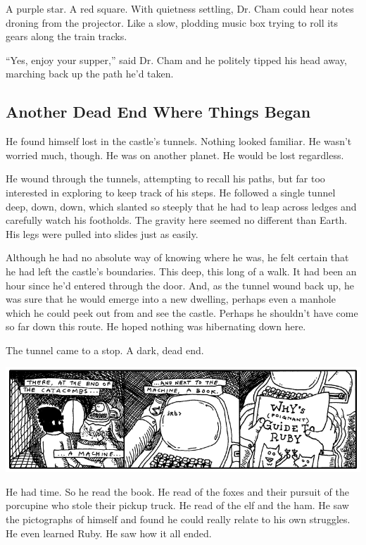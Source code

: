 \documentclass[10pt,twoside]{report}
\begin{document}
A purple star.  A red square.  With quietness settling, Dr. Cham could
hear notes droning from the projector.  Like a slow, plodding music
box trying to roll its gears along the train tracks.

``Yes, enjoy your supper,'' said Dr. Cham and he politely tipped his
head away, marching back up the path he'd taken.



\subsection{Another Dead End Where Things Began}



He found himself lost in the castle's tunnels.  Nothing looked
familiar.  He wasn't worried much, though.  He was on another planet.
He would be lost regardless.

He wound through the tunnels, attempting to recall his paths, but far
too interested in exploring to keep track of his steps.  He followed a
single tunnel deep, down, down, which slanted so steeply that he had
to leap across ledges and carefully watch his footholds. The gravity
here seemed no different than Earth.  His legs were pulled into slides
just as easily.

Although he had no absolute way of knowing where he was, he felt
certain that he had left the castle's boundaries.  This deep, this
long of a walk.  It had been an hour since he'd entered through the
door.  And, as the tunnel wound back up, he was sure that he would
emerge into a new dwelling, perhaps even a manhole which he could peek
out from and see the castle.  Perhaps he shouldn't have come so far
down this route.  He hoped nothing was hibernating down here.

The tunnel came to a stop.  A dark, dead end.

	\includegraphics[width=1.0\textwidth]{cache/39.png}

He had time.  So he read the book.  He read of the foxes and their
pursuit of the porcupine who stole their pickup truck.  He read of the
elf and the ham.  He saw the pictographs of himself and found he could
really relate to his own struggles.  He even learned Ruby.  He saw how
it all ended.
\end{document}
